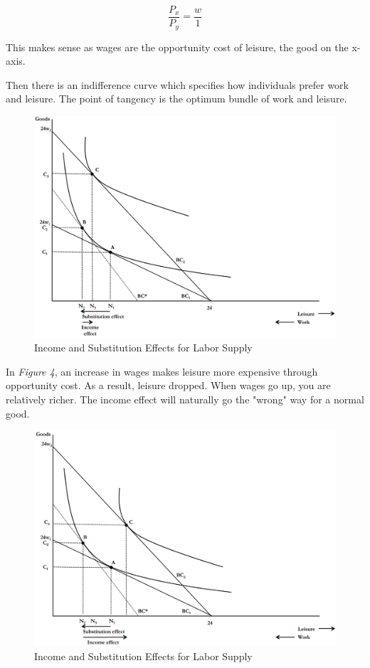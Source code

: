 \documentclass{article}
\begin{document}
$$\frac{P_{x}}{P_{y}}=\frac{w}{1}$$

This makes sense as wages are the opportunity cost of leisure, the good on the x-axis.

Then there is an indifference curve which specifies how individuals prefer work and leisure. The point of tangency is the optimum bundle of work and leisure.

\begin{figure}[H]
    \centering
    \includegraphics[scale=0.33]{"Figure 16-4"}
    \caption{Income and Substitution Effects for Labor Supply}
\end{figure}

In \textit{Figure 4}, an increase in wages makes leisure more expensive through opportunity cost. As a result, leisure dropped. When wages go up, you are relatively richer. The income effect will naturally go the "wrong" way for a normal good.

\begin{figure}
    \centering
    \includegraphics[scale=0.33]{"Figure 16-5"}
    \caption{Income and Substitution Effects for Labor Supply}
\end{figure}
\end{document}

